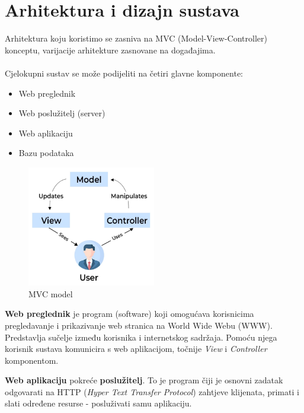 \chapter{Arhitektura i dizajn sustava}

		Arhitektura koju koristimo se zasniva na MVC (Model-View-Controller) konceptu, varijacije arhitekture zasnovane na događajima.
        \\
        \\
        Cjelokupni sustav se može podijeliti na četiri glavne komponente:
            \begin{itemize}
                \item Web preglednik
                \item Web poslužitelj (server)
                \item Web aplikaciju
                \item Bazu podataka
            \end{itemize}
    
        \begin{figure}[h]
            \centering
            \includegraphics[width=0.5\textwidth]{slike/mvc.png}
            \caption{MVC model}
            \label{fig:mesh1}
        \end{figure}
        
        \textbf{Web preglednik} je program (software) koji omogućava korisnicima pregledavanje i prikazivanje web stranica na World Wide Webu (WWW). Predstavlja sučelje između korisnika i internetskog sadržaja. Pomoću njega korisnik sustava komunicira s web aplikacijom, točnije \textit{View} i \textit{Controller} komponentom.
        
        \pagebreak

        \textbf{Web aplikaciju} pokreće \textbf{poslužitelj}. To je program čiji je osnovni zadatak odgovarati na HTTP (\textit{Hyper Text Transfer Protocol}) zahtjeve klijenata, primati i slati određene resurse - posluživati samu aplikaciju. 
        

